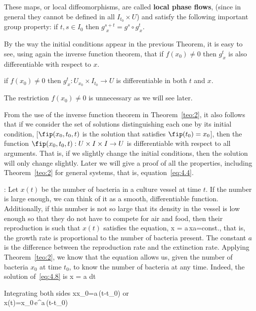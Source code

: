 These maps, or local diffeomorphisms, are called 
{\bf local phase flows}, 
(since in general they cannot be
defined in all $I_{t_0}\times U$) and satisfy the following
important group property: if $t,s \in I_0$ then
$g^{s+t}_{\,\,x}=g^s \circ g^t_{\,x}$.


By the way the initial conditions appear in the previous Theorem,
it is easy to see, using again the inverse function theorem, 
that if $f(x_0)\neq 0$ then $g^t_{\,x}$ is also differentiable 
with respect to $x$.

\begin{cor} if $f(x_0)\neq 0$ then
$g^t_{\,x}:U_{x_0}\times I_{t_0}\to U$ is differentiable in both $t$ and
$x$.
\label{cor1}
\end{cor}
 The restriction $f(x_0)\neq 0$ is
unnecessary as we will see later.
\espa

From the use of the inverse function theorem in Theorem~\ref{teo:2}, it also
follows that if we consider the set of solutions distinguishing
each one by its initial condition,
[$\fip(x_0,t_0,t)$ is the solution that satisfies $\fip(t_0)=x_0$],
then the function $\fip(x_0,t_0,t):U\times I\times I\to U$ is
differentiable with respect to all arguments. That is, if
we slightly change the initial conditions, then the solution
will only change slightly. Later we will give a proof of all
the properties, including Theorem~\ref{teo:2} for general systems,
that is, equation~\ref{eq:4.4}.
\espa


\ejem:
Let $x(t)$ be the number of bacteria in a culture vessel at time $t$. If the number is large enough, we can think of it as a smooth, differentiable function. Additionally, if this number is not so large that its density in the vessel is low enough so that they do not have to compete for air and food, then their reproduction is such that $x(t)$ satisfies the equation,
\beq
\dot x = a\,x\;\;\;\;\;\;a=\mbox{const.},
\label{eq:4.8}
\eeq
that is, the growth rate is proportional to the number of bacteria present. The constant $a$ is the difference between the reproduction rate and the extinction rate. Applying Theorem~\ref{teo:2}, we know that the equation allows us, given the number of bacteria $x_0$ at time $t_0$, to know the number of bacteria at any time. Indeed, the solution of~\ref{eq:4.8} is 
\beq 
{}x = a\,\,dt
\eeq 

\noi Integrating both sides
\beq 
\ln \frac x{x_0}=a\,(t-t_0) \;\;\;\mbox{or}\\ \;\;\;
x(t)=x_0\,\mbox{e}^{a\,(t-t_0)} 
\eeq 

